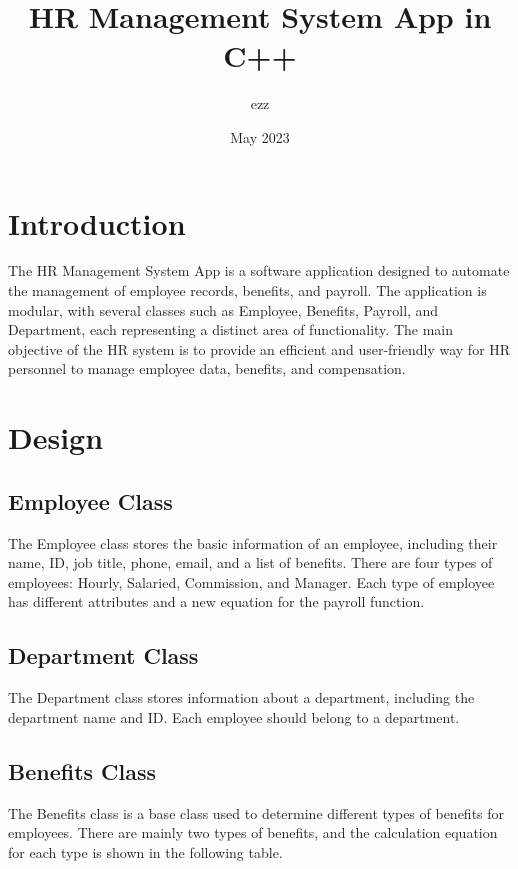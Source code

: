\documentclass{article}
\title{HR Management System App in C++}
\author{ezz}
\date{May 2023}
\begin{document}
\maketitle

\section{Introduction}

The HR Management System App is a software application designed to automate the management of employee records, benefits, and payroll. The application is modular, with several classes such as Employee, Benefits, Payroll, and Department, each representing a distinct area of functionality. The main objective of the HR system is to provide an efficient and user-friendly way for HR personnel to manage employee data, benefits, and compensation.

\section{Design}

\subsection{Employee Class}

The Employee class stores the basic information of an employee, including their name, ID, job title, phone, email, and a list of benefits. There are four types of employees: Hourly, Salaried, Commission, and Manager. Each type of employee has different attributes and a new equation for the payroll function.

\subsection{Department Class}

The Department class stores information about a department, including the department name and ID. Each employee should belong to a department.

\subsection{Benefits Class}

The Benefits class is a base class used to determine different types of benefits for employees. There are mainly two types of benefits, and the calculation equation for each type is shown in the following table.
\end{document}
